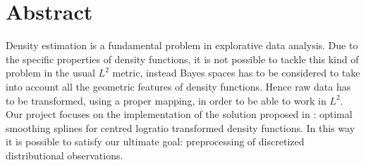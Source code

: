 \newpage
\chapter*{Abstract}


Density estimation is a fundamental problem in explorative data analysis.
Due to the specific properties of density functions, it is not possible to tackle this kind of problem in the usual $\textit{L}^2$ metric, instead Bayes spaces has to be considered to take into account all the geometric features of density functions. Hence raw data has to be transformed, using a proper mapping, in order to be able to work in $\textit{L}^2$.\\
Our project focuses on the implementation of the solution proposed in \citep{paper:pacs}: optimal smoothing splines for centred logratio transformed density functions. In this way it is possible to satisfy our ultimate goal: preprocessing of discretized distributional observations. 


